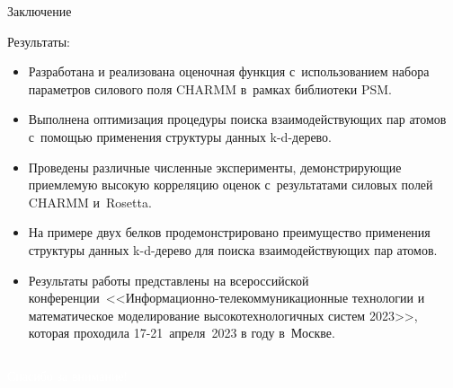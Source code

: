 \documentclass[sans,aspectratio=169]{beamer}
\begin{document}
\begin{frame}{Заключение}
	\fontsize{11}{12}\selectfont
	\hangindent=-0.5cm
	 \noindent
	\setlength{\leftmargini}{20pt}
	
	\vspace{-5pt}

Результаты:
\begin{itemize}
	\item Разработана и реализована оценочная функция с~использованием набора параметров силового поля CHARMM в~рамках библиотеки PSM. 
	\item Выполнена оптимизация процедуры поиска взаимодействующих пар атомов с~помощью применения структуры данных k-d-дерево.
	\item Проведены различные численные эксперименты, демонстрирующие приемлемую высокую корреляцию оценок с~результатами силовых полей CHARMM и~Rosetta.
	\item На примере двух белков продемонстрировано преимущество применения структуры данных k-d-дерево для поиска взаимодействующих пар атомов.
	\item Результаты работы представлены на всероссийской конференции~<<Информационно-телекоммуникационные технологии и математическое моделирование высокотехнологичных систем 2023>>, которая проходила 17-21~апреля~2023 в году в~Москве.
\end{itemize}

\end{frame}



\begin{frame}
	\fontsize{20}{25}\selectfont
	
	
	\begin{columns}[c]
		\centering
		
		\begin{exampleblock}{}
			{
				\vskip3mm
				\begin{center}
					\textcolor{white}{Спасибо за внимание!}
				\end{center}
				\vskip5mm
			}
		\end{exampleblock}
		
	\end{columns}
	
\end{frame}
\end{document}
